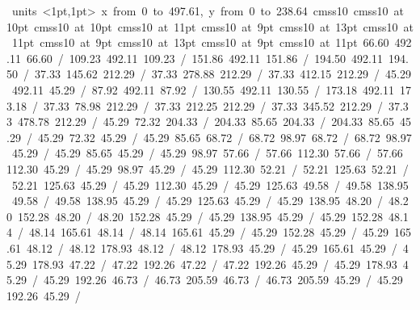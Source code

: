 \documentclass[12pt,a4paper]{report}
\begin{document}
\hbox{\beginpicture
\setcoordinatesystem units <1pt,1pt>
\setplotarea x from 0 to 497.61, y from 0 to 238.64
\setlinear
\font\picfont cmss10\picfont
\font\picfont cmss10 at 10pt\picfont
\font\picfont cmss10 at 10pt\picfont
\font\picfont cmss10 at 11pt\picfont
\font\picfont cmss10 at 9pt\picfont
\font\picfont cmss10 at 13pt\picfont
\font\picfont cmss10 at 11pt\picfont
\font\picfont cmss10 at 9pt\picfont
\font\picfont cmss10 at 13pt\picfont
\font\picfont cmss10 at 9pt\picfont
\font\picfont cmss10 at 11pt\picfont
\setsolid
{} 66.60 492.11 66.60 /
\setsolid
{} 109.23 492.11 109.23 /
\setsolid
{} 151.86 492.11 151.86 /
\setsolid
{} 194.50 492.11 194.50 /
\setsolid
{} 37.33 145.62 212.29 /
\setsolid
{} 37.33 278.88 212.29 /
\setsolid
{} 37.33 412.15 212.29 /
\setsolid
{} 45.29 492.11 45.29 /
\setsolid
{} 87.92 492.11 87.92 /
\setsolid
{} 130.55 492.11 130.55 /
\setsolid
{} 173.18 492.11 173.18 /
\setsolid
{} 37.33 78.98 212.29 /
\setsolid
{} 37.33 212.25 212.29 /
\setsolid
{} 37.33 345.52 212.29 /
\setsolid
{} 37.33 478.78 212.29 /
\setsolid
{} 45.29 72.32 204.33 /
 204.33 85.65 204.33 /
 204.33 85.65 45.29 /
 45.29 72.32 45.29 /
\setsolid
{} 45.29 85.65 68.72 /
 68.72 98.97 68.72 /
 68.72 98.97 45.29 /
 45.29 85.65 45.29 /
\setsolid
{} 45.29 98.97 57.66 /
 57.66 112.30 57.66 /
 57.66 112.30 45.29 /
 45.29 98.97 45.29 /
\setsolid
{} 45.29 112.30 52.21 /
 52.21 125.63 52.21 /
 52.21 125.63 45.29 /
 45.29 112.30 45.29 /
\setsolid
{} 45.29 125.63 49.58 /
 49.58 138.95 49.58 /
 49.58 138.95 45.29 /
 45.29 125.63 45.29 /
\setsolid
{} 45.29 138.95 48.20 /
 48.20 152.28 48.20 /
 48.20 152.28 45.29 /
 45.29 138.95 45.29 /
\setsolid
{} 45.29 152.28 48.14 /
 48.14 165.61 48.14 /
 48.14 165.61 45.29 /
 45.29 152.28 45.29 /
\setsolid
{} 45.29 165.61 48.12 /
 48.12 178.93 48.12 /
 48.12 178.93 45.29 /
 45.29 165.61 45.29 /
\setsolid
{} 45.29 178.93 47.22 /
 47.22 192.26 47.22 /
 47.22 192.26 45.29 /
 45.29 178.93 45.29 /
\setsolid
{} 45.29 192.26 46.73 /
 46.73 205.59 46.73 /
 46.73 205.59 45.29 /
 45.29 192.26 45.29 /
}
\end{document}
